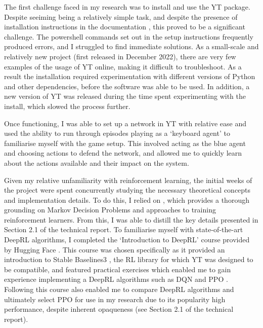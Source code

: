 \documentclass{article}
\begin{document}




The first challenge faced in my research was to install and use the YT package. Despite seeiming being a relatively simple task, and despite the presence of installation instructions in the documentation \cite{YTdocs}, this proved to be a significant challenge. The powershell commands set out in the setup instructions frequently produced errors, and I struggled to find immediate solutions. As a small-scale and relatively new project (first released in December 2022), there are very few examples of the usage of YT online, making it difficult to troubleshoot. As a result the installation required experimentation with different versions of Python and other dependencies, before the software was able to be used. In addition, a new version of YT was released during the time spent experimenting with the install, which slowed the process further. 

Once functioning, I was able to set up a network in YT with relative ease and used the ability to run through episodes playing as a `keyboard agent' to familiarise myself with the game setup.  This involved acting as the blue agent and choosing actions to defend the network, and allowed me to quickly learn about the actions available and their impact on the system.

Given my relative unfamiliarity with reinforcement learning, the initial weeks of the project were spent concurrently studying the necessary theoretical concepts and implementation details. To do this, I relied on \cite{sutton2018reinforcement}, which provides a thorough grounding on Markov Decision Problems and approaches to training reinforcement learners. From this, I was able to distill the key details presented in Section 2.1 of the technical report. To familiarise myself with state-of-the-art DeepRL algorithms, I completed the `Introduction to DeepRL' course provided by Hugging Face \cite{HFcourse}. This course was chosen specifically as it provided an introduction to Stable Baselines3 \cite{stable-baselines3}, the RL library for which YT was designed to be compatible, and featured practical exercises which enabled me to gain experience implementing a DeepRL algorithms such as DQN \cite{mnih2013playing} and PPO \cite{schulman2017proximal}. Following this course also enabled me to compare DeepRL algorithms and ultimately select PPO for use in my research due to its popularity high performance, despite inherent opaqueness (see Section 2.1 of the technical report). 
\end{document}
